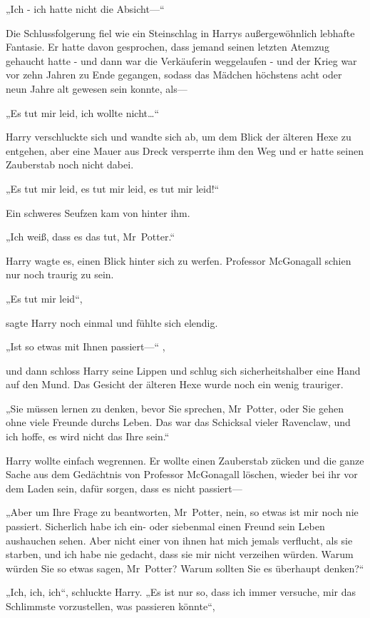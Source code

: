 {„Ich - ich hatte nicht die Absicht—“

Die Schlussfolgerung fiel wie ein Steinschlag in Harrys außergewöhnlich lebhafte Fantasie. Er hatte davon gesprochen, dass jemand seinen letzten Atemzug gehaucht hatte - und dann war die Verkäuferin weggelaufen - und der Krieg war vor zehn Jahren zu Ende gegangen, sodass das Mädchen höchstens acht oder neun Jahre alt gewesen sein konnte, als—

„Es tut mir leid, ich wollte nicht…“

Harry verschluckte sich und wandte sich ab, um dem Blick der älteren Hexe zu entgehen, aber eine Mauer aus Dreck versperrte ihm den Weg und er hatte seinen Zauberstab noch nicht dabei.

„Es tut mir leid, es tut mir leid, es tut mir leid!“

Ein schweres Seufzen kam von hinter ihm.

„Ich weiß, dass es das tut, Mr~Potter.“

Harry wagte es, einen Blick hinter sich zu werfen. Professor McGonagall schien nur noch traurig zu sein.

„Es tut mir leid“,

sagte Harry noch einmal und fühlte sich elendig.

„Ist so etwas mit Ihnen passiert—“ ,

und dann schloss Harry seine Lippen und schlug sich sicherheitshalber eine Hand auf den Mund. Das Gesicht der älteren Hexe wurde noch ein wenig trauriger.

„Sie müssen lernen zu denken, bevor Sie sprechen, Mr~Potter, oder Sie gehen ohne viele Freunde durchs Leben. Das war das Schicksal vieler Ravenclaw, und ich hoffe, es wird nicht das Ihre sein.“

Harry wollte einfach wegrennen. Er wollte einen Zauberstab zücken und die ganze Sache aus dem Gedächtnis von Professor McGonagall löschen, wieder bei ihr vor dem Laden sein, dafür sorgen, dass es nicht passiert—

„Aber um Ihre Frage zu beantworten, Mr~Potter, nein, so etwas ist mir noch nie passiert. Sicherlich habe ich ein- oder siebenmal einen Freund sein Leben aushauchen sehen. Aber nicht einer von ihnen hat mich jemals verflucht, als sie starben, und ich habe nie gedacht, dass sie mir nicht verzeihen würden. Warum würden Sie so etwas sagen, Mr~Potter? Warum sollten Sie es überhaupt denken?“

„Ich, ich, ich“, schluckte Harry. „Es ist nur so, dass ich immer versuche, mir das Schlimmste vorzustellen, was passieren könnte“,

}
